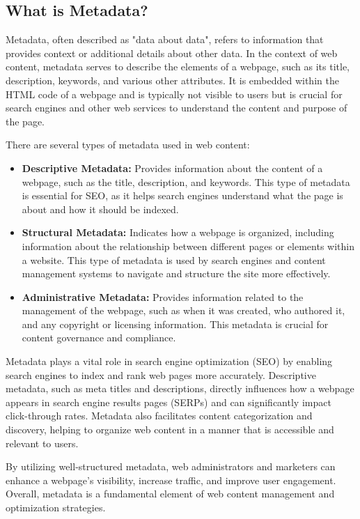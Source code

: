 \subsection{What is Metadata?}
\label{subsec:what_is_metadata}
Metadata, often described as "data about data", refers to information that provides context or additional details about other data. 
In the context of web content, metadata serves to describe the elements of a webpage, such as its title, description, keywords, and various other attributes.
It is embedded within the HTML code of a webpage and is typically not visible to users but is crucial for search engines and other web services to understand the content and purpose of the page.

There are several types of metadata used in web content:

\begin{itemize}
    \item \textbf{Descriptive Metadata:} Provides information about the content of a webpage, such as the title, description, and keywords. 
    This type of metadata is essential for SEO, as it helps search engines understand what the page is about and how it should be indexed.
    \item \textbf{Structural Metadata:} Indicates how a webpage is organized, including information about the relationship between different pages or elements within a website. 
    This type of metadata is used by search engines and content management systems to navigate and structure the site more effectively.
    \item \textbf{Administrative Metadata:} Provides information related to the management of the webpage, such as when it was created, who authored it, and any copyright or licensing information. 
    This metadata is crucial for content governance and compliance.
\end{itemize}

Metadata plays a vital role in search engine optimization (SEO) by enabling search engines to index and rank web pages more accurately. 
Descriptive metadata, such as meta titles and descriptions, directly influences how a webpage appears in search engine results pages (SERPs) and can significantly impact click-through rates.
Metadata also facilitates content categorization and discovery, helping to organize web content in a manner that is accessible and relevant to users.

By utilizing well-structured metadata, web administrators and marketers can enhance a webpage's visibility, increase traffic, and improve user engagement. 
Overall, metadata is a fundamental element of web content management and optimization strategies.

